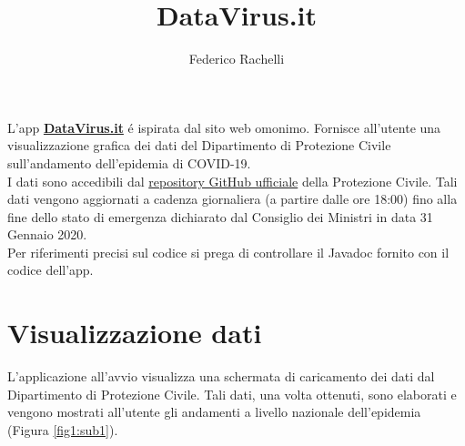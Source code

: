 \documentclass{article}
\begin{document}
    \author{Federico Rachelli}
    \title{\vspace{-2cm}DataVirus.it}
    \maketitle

    L'app \textbf{\href{https://datavirus.it}{DataVirus.it}} é ispirata dal sito web omonimo.
    Fornisce all'utente una visualizzazione grafica dei dati del Dipartimento di Protezione Civile sull'andamento dell'epidemia di COVID-19.
    \\
    I dati sono accedibili dal \href{https://github.com/pcm-dpc/COVID-19}{repository GitHub ufficiale} della Protezione Civile. 
    Tali dati vengono aggiornati a cadenza giornaliera (a partire dalle ore 18:00) fino alla fine dello stato di emergenza dichiarato dal Consiglio dei Ministri in data 31 Gennaio 2020.
    \\
    Per riferimenti precisi sul codice si prega di controllare il Javadoc fornito con il codice dell'app.
    
    \section{Visualizzazione dati}
    L'applicazione all'avvio visualizza una schermata di caricamento dei dati dal Dipartimento di Protezione Civile. 
    Tali dati, una volta ottenuti, sono elaborati e vengono mostrati all'utente gli andamenti a livello nazionale dell'epidemia (Figura \ref{fig1:sub1}).
    
\end{document}
